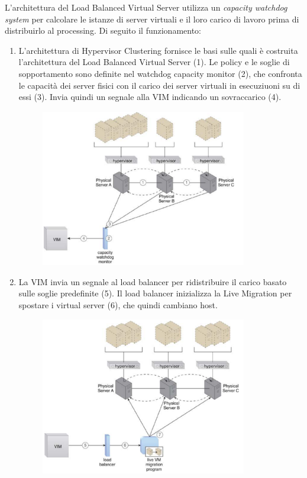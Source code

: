 L'architettura del Load Balanced Virtual Server utilizza un \textit{capacity watchdog system} per calcolare le istanze di server virtuali e il loro carico di lavoro prima di distribuirlo al processing. Di seguito il funzionamento:
\begin{enumerate}
    \item L'architettura di Hypervisor Clustering fornisce le basi sulle quali è costruita l'architettura del Load Balanced Virtual Server (1). Le policy e le soglie di sopportamento sono definite nel watchdog capacity monitor (2), che confronta le capacità dei server fisici con il carico dei server virtuali in esecuziuoni su di essi (3). Invia quindi un segnale alla VIM indicando un sovraccarico (4).

    \begin{figure}[htb!]
    \centering
    \includegraphics[width=9cm]{./Images/cap12/12.3.png}
    \end{figure}
    
    \item La VIM invia un segnale al load balancer per ridistribuire il carico basato sulle soglie predefinite (5). Il load balancer inizializza la Live Migration per spostare i virtual server (6), che quindi cambiano host.

    \begin{figure}[htb!]
    \centering
    \includegraphics[width=9cm]{./Images/cap12/12.4.png}
    \end{figure}
    

\end{enumerate}

